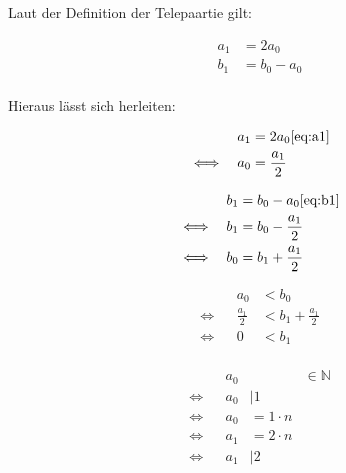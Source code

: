 \documentclass[a4paper,10pt,ngerman]{scrartcl}
\begin{document}
Laut der Definition der Telepaartie gilt:

\begin{align}
    a_1 &= 2 a_0 \label{eq:a1} \\
    b_1 &= b_0 - a_0 \label{eq:b1} \\
\end{align}

Hieraus lässt sich herleiten:

\begin{center}
    \begin{minipage}{0.23\textwidth}
        \begin{align*}
            && a_1 &= 2 a_0 \cref{eq:a1} \\
            \iff&& a_0 &= \frac{a_1}{2} \\
        \end{align*}
    \end{minipage}
    \begin{minipage}{0.23\textwidth}
        \begin{align*}
            && b_1 &= b_0 - a_0 \cref{eq:b1} \\
            \iff&& b_1 &= b_0 - \frac{a_1}{2} \\
            \iff&& b_0 &= b_1 + \frac{a_1}{2} \\
        \end{align*}
    \end{minipage}
    \begin{minipage}{0.23\textwidth}
        \begin{align*}
            && a_0 &< b_0 \\
            \iff&& \frac{a_1}{2} &< b_1 + \frac{a_1}{2} \\
            \iff&& 0 &< b_1 \\
        \end{align*}
    \end{minipage}
    \begin{minipage}{0.23\textwidth}
        \begin{align*}
            && a_0 &&\in \mathbb{N} \\
            \iff&& a_0 &\mid 1 \\
            \iff&& a_0 &= 1 \cdot n \\
            \iff&& a_1 &= 2 \cdot n \\
            \iff&& a_1 &\mid 2 \\
        \end{align*}
    \end{minipage}
\end{center}
\end{document}
